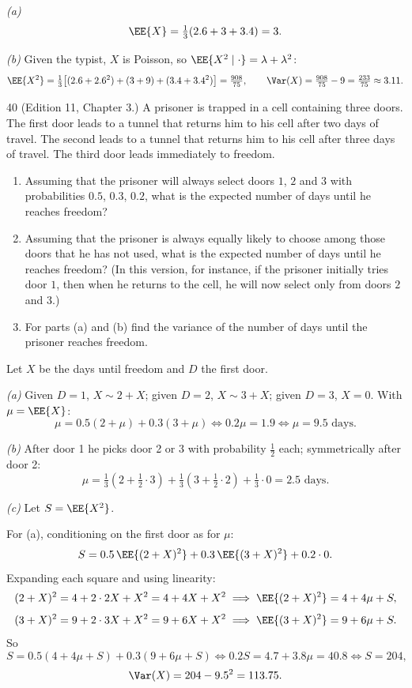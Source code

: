 \documentclass[11pt]{article}
\begin{document}
\emph{(a)}
\[
  \EE{X} = \tfrac13(2.6 + 3 + 3.4) = 3.
\]

\emph{(b)} Given the typist, $X$ is Poisson, so $\EE{X^2 \mid \cdot} = \lambda + \lambda^2$:
\[
  \EE{X^2} = \tfrac13\big[(2.6 + 2.6^2) + (3 + 9) + (3.4 + 3.4^2)\big] = \tfrac{908}{75},
  \qquad
  \Var(X) = \tfrac{908}{75} - 9 = \tfrac{233}{75} \approx 3.11.
\]

\begin{problem}{40}
  (Edition 11, Chapter 3.) A prisoner is trapped in a cell containing three
  doors. The first door leads to a tunnel that returns him to his cell after two
  days of travel. The second leads to a tunnel that returns him to his cell
  after three days of travel. The third door leads immediately to freedom.
  \begin{enumerate}
    \item[(a)] Assuming that the prisoner will always select doors $1$, $2$ and
      $3$ with probabilities $0.5$, $0.3$, $0.2$, what is the expected number of
      days until he reaches freedom?
    \item[(b)] Assuming that the prisoner is always equally likely to choose
      among those doors that he has not used, what is the expected number of days
      until he reaches freedom? (In this version, for instance, if the prisoner
      initially tries door $1$, then when he returns to the cell, he will now
      select only from doors $2$ and $3$.)
    \item[(c)] For parts (a) and (b) find the variance of the number of days
      until the prisoner reaches freedom.
  \end{enumerate}
\end{problem}
Let $X$ be the days until freedom and $D$ the first door.

\emph{(a)} Given $D=1$, $X \sim 2 + X$; given $D=2$, $X \sim 3 + X$; given $D=3$, $X = 0$. With $\mu = \EE{X}$:
\[
  \mu = 0.5(2+\mu) + 0.3(3+\mu) \iff 0.2\mu = 1.9 \iff \mu = 9.5 \text{ days}.
\]

\emph{(b)} After door 1 he picks door 2 or 3 with probability $\tfrac12$ each; symmetrically after door 2:
\[
  \mu = \tfrac13\left(2 + \tfrac12\cdot 3\right) + \tfrac13\left(3 + \tfrac12\cdot 2\right) + \tfrac13\cdot 0
      = 2.5 \text{ days}.
\]

\emph{(c)} Let $S = \EE{X^2}$.

For (a), conditioning on the first door as for $\mu$:
\[
  S = 0.5\,\EE{(2+X)^2} + 0.3\,\EE{(3+X)^2} + 0.2\cdot 0.
\]
Expanding each square and using linearity:
\[
  (2+X)^2 = 4 + 2\cdot 2X + X^2 = 4 + 4X + X^2 \implies \EE{(2+X)^2} = 4 + 4\mu + S,
\]
\[
  (3+X)^2 = 9 + 2\cdot 3X + X^2 = 9 + 6X + X^2 \implies \EE{(3+X)^2} = 9 + 6\mu + S.
\]
So
\[
  S = 0.5(4 + 4\mu + S) + 0.3(9 + 6\mu + S) \iff 0.2S = 4.7 + 3.8\mu = 40.8 \iff S = 204,
\]
\[
  \Var(X) = 204 - 9.5^2 = 113.75.
\]
\end{document}
